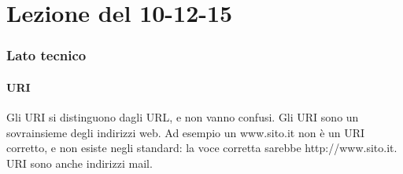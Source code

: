 \section{Lezione del 10-12-15}

\subsubsection{Lato tecnico}

\paragraph*{URI}Gli URI si distinguono dagli URL, e non vanno confusi. Gli URI sono un sovrainsieme degli indirizzi web. Ad esempio un www.sito.it non \`e un URI corretto, e non esiste negli standard: la voce corretta sarebbe http://www.sito.it. URI sono anche indirizzi mail.

